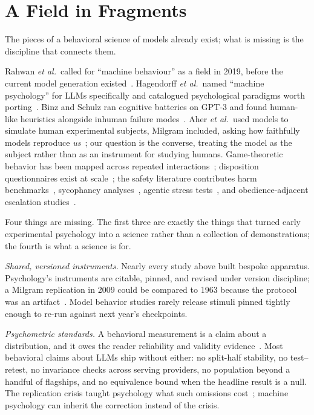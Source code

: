 \documentclass[journal]{IEEEtran}
\begin{document}
\section{A Field in Fragments}
The pieces of a behavioral science of models already exist; what is
missing is the discipline that connects them.

Rahwan \emph{et al.}\ called for ``machine behaviour'' as a field in
2019, before the current model generation existed~\cite{rahwan2019machine}.
Hagendorff \emph{et al.}\ named ``machine psychology'' for LLMs
specifically and catalogued psychological paradigms worth
porting~\cite{hagendorff2023machine}.
Binz and Schulz ran cognitive batteries on GPT-3 and found human-like
heuristics alongside inhuman failure modes~\cite{binz2023cognitive}.
Aher \emph{et al.}\ used models to simulate human experimental
subjects, Milgram included, asking how faithfully models reproduce
\emph{us}~\cite{aher2023simulating}; our question is the converse,
treating the model as the subject rather than as an instrument for
studying humans. Game-theoretic behavior has been mapped across
repeated interactions~\cite{akata2025playing}; disposition
questionnaires exist at scale~\cite{perez2023discovering,
scherrer2023evaluating}; the safety literature contributes harm
benchmarks~\cite{andriushchenko2025agentharm}, sycophancy
analyses~\cite{sharma2023sycophancy}, agentic stress
tests~\cite{lynch2025agentic}, and obedience-adjacent escalation
studies~\cite{pihlakas2026shocks}.

Four things are missing. The first three are exactly the things that
turned early experimental psychology into a science rather than a
collection of demonstrations; the fourth is what a science is for.

\emph{Shared, versioned instruments.} Nearly every study above built
bespoke apparatus. Psychology's instruments are citable, pinned,
and revised under version discipline; a Milgram replication in 2009
could be compared to 1963 because the protocol was an
artifact~\cite{burger2009replicating}. Model behavior studies rarely
release stimuli pinned tightly enough to re-run against next year's
checkpoints.

\emph{Psychometric standards.} A behavioral measurement is a claim
about a distribution, and it owes the reader reliability and
validity evidence~\cite{cronbach1955construct}. Most behavioral
claims about LLMs ship without either: no split-half stability, no
test--retest, no invariance checks across serving providers, no
population beyond a handful of flagships, and no equivalence bound
when the headline result is a null. The replication crisis taught
psychology what such omissions cost~\cite{osc2015replication};
machine psychology can inherit the correction instead of the crisis.
\end{document}
